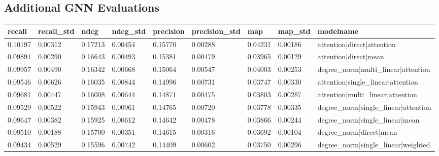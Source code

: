 \documentclass{article}
\begin{document}


\subsection{Additional GNN Evaluations} \label{additional-gnn-eval}


\begin{table}
\centering
\begin{tabular}{lllllllll}
\hline
recall  & recall\_std & ndcg    & ndcg\_std & precision & precision\_std & map     & map\_std & modelname                             \\ \hline
0.10197 & 0.00312     & 0.17213 & 0.00454   & 0.15770   & 0.00288        & 0.04231 & 0.00186  & attention|direct|attention            \\ \hline
0.09891 & 0.00290     & 0.16643 & 0.00493   & 0.15381   & 0.00479        & 0.03965 & 0.00129  & attention|direct|mean                 \\ \hline
0.09957 & 0.00490     & 0.16342 & 0.00668   & 0.15064   & 0.00547        & 0.04003 & 0.00253  & degree\_norm|multi\_linear|attention  \\ \hline
0.09546 & 0.00626     & 0.16035 & 0.00844   & 0.14996   & 0.00731        & 0.03747 & 0.00330  & attention|single\_linear|attention    \\ \hline
0.09681 & 0.00447     & 0.16008 & 0.00644   & 0.14871   & 0.00475        & 0.03803 & 0.00287  & attention|multi\_linear|attention     \\ \hline
0.09529 & 0.00522     & 0.15943 & 0.00961   & 0.14765   & 0.00720        & 0.03778 & 0.00335  & degree\_norm|single\_linear|attention \\ \hline
0.09647 & 0.00382     & 0.15925 & 0.00612   & 0.14642   & 0.00478        & 0.03866 & 0.00244  & degree\_norm|single\_linear|mean      \\ \hline
0.09510 & 0.00188     & 0.15700 & 0.00351   & 0.14615   & 0.00316        & 0.03692 & 0.00104  & degree\_norm|direct|mean              \\ \hline
0.09434 & 0.00529     & 0.15596 & 0.00742   & 0.14409   & 0.00602        & 0.03750 & 0.00296  & degree\_norm|single\_linear|weighted  \\ \hline

\end{tabular}
\end{table}
\end{document}
